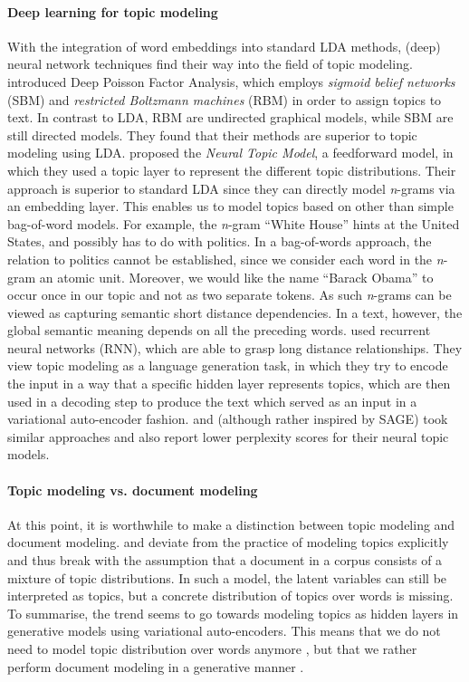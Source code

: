 \paragraph{Deep learning for topic modeling} With the integration of word embeddings into standard LDA methods, (deep) neural network techniques find their way into the field of topic modeling. \citet{ganscalable2015} introduced Deep Poisson Factor Analysis, which employs \textit{sigmoid belief networks} (SBM) and \textit{restricted Boltzmann machines} (RBM) in order to assign topics to text. In contrast to LDA, RBM are undirected graphical models, while SBM are still directed models. They found that their methods are superior to topic modeling using LDA. \citet{cao_novel_2015} proposed  the \textit{Neural Topic Model}, a feedforward model, in which they used a topic layer to represent the different topic distributions. Their approach is superior to standard LDA since they can directly model \textit{n}-grams via an embedding layer. This enables us to model topics based on other than simple bag-of-word models. For example, the \textit{n}-gram ``White House'' hints at the United States, and possibly has to do with politics. In a bag-of-words approach, the relation to politics cannot be established, since we consider each word in the \textit{n}-gram an atomic unit. Moreover, we would like the name ``Barack Obama'' to occur once in our topic and not as two separate tokens. As such \textit{n}-grams can be viewed as capturing semantic short distance dependencies. In a text, however, the global semantic meaning depends on all the preceding words. \citet{DiengWGP16} used recurrent neural networks (RNN), which are able to grasp long distance relationships. They view topic modeling as a language generation task, in which they try to encode the input in a way that a specific hidden layer represents topics, which are then used in a decoding step to produce the text which served as an input in a variational auto-encoder fashion. \citet{miao_neural_2016}  and \citet{CardTS17} (although rather inspired by SAGE) took similar approaches and also report lower perplexity scores for their neural topic models.

\paragraph{Topic modeling vs. document modeling} At this point, it is worthwhile to make a distinction between topic modeling and document modeling. \citet{miao_neural_2016} and \citet{CardTS17} deviate from the practice of modeling topics explicitly and thus break with the assumption that a document in a corpus consists of a mixture of topic distributions. In such a model, the latent variables can still be interpreted as topics, but a concrete distribution of topics over words is missing. To summarise, the trend seems to go towards modeling topics as hidden layers in generative models using variational auto-encoders. This means that we do not need to model topic distribution over words anymore \citep{Srivastava2016NeuralVI}, but that we rather perform document modeling in a generative manner \citep{MiaoGB17}.

